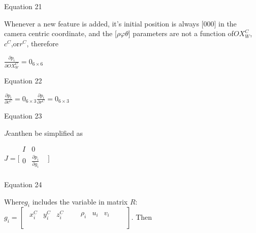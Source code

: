 Equation 21

Whenever a new feature is added, it's initial position is always $
\lbrack 0 0 0\rbrack $ in the camera centric coordinate, and the $
\lbrack \rho \varphi \theta \rbrack $ parameters are not a function of$
OX_{W}^{C}$, $c^{C}$,or$r^{C}$, therefore

$\frac{\partial p_{i}}{\partial OX_{W}^{C}}=0_{6\times 6}$\\


\begin{center}Equation 22\end{center}

$\frac{\partial p_{i}}{\partial c^{C}}=0_{6\times 3}\frac{\partial 
p_{i}}{\partial r^{C}}= 0_{6\times 3}$\\


\begin{center}Equation 23\end{center}

$J$canthen be simplified as

$J=\lbrack \begin{matrix}
I & 0 & \\
0 & \frac{\partial p_{i}}{\partial g_{i}} & \\
\end{matrix}
\rbrack $\\


\begin{center}Equation 24\end{center}

Where$g_{i}$ includes the variable in matrix $R$: $
g_{i}=[\begin{matrix}
\begin{matrix}
x_{i}^{C} & y_{i}^{C} & z_{i}^{C} & \\
\end{matrix}
 & \begin{matrix}
\rho _{i} & u_{i} & v_{i} & \\
\end{matrix}
 & \\
\end{matrix}
]$. Then 

